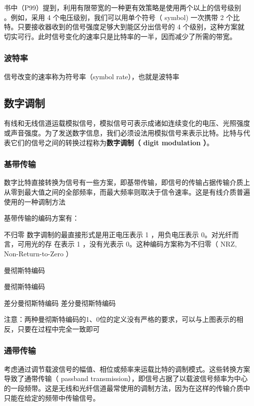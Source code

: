 书中（P99）提到，利用有限带宽的一种更有效策略是使用两个以上的信号级别 。例如，采用 4 个电压级别，我们可以用单个符号（ symbol) 一次携带 2 个比特。只要接收器收到的信号强度足够大到能区分出信号的 4 个级别，这种方案就切实可行。此时信号变化的速率只是比特率的一半，因而减少了所需的带宽。 

\subsubsection{波特率}
信号改变的速率称为符号率（symbol rate），也就是波特率

\subsection{数字调制}
有线和无线信道运载模拟信号，模拟信号可表示成诸如连续变化的电压、光照强度或声音强度。为了发送数字信息，我们必须设法用模拟信号来表示比特。比特与代表它们的信号之间的转换过程称为\textbf{数字调制（ digit modulation ）}。 
\subsubsection{基带传输}
数字比特直接转换为信号有一些方案，即基带传输，即信号的传输占据传输介质上从零到最大值之间的全部频率，而最大频率则取决于信令速率。这是有线介质普遍使用的一种调制方法 

基带传输的编码方案有：
\begin{parabox}{不归零}
    数字调制的最直接形式是用正电压表示 1 ，用负电压表示 0。对光纤而言，可用光的存
在表示 1 ，没有光表示 0。这种编码方案称为不归零（ NRZ, Non-Return-to-Zero ）     
\end{parabox}

\begin{parabox}{曼彻斯特编码}

    曼彻斯特编码
\end{parabox}

\begin{parabox}{差分曼彻斯特编码}
    差分曼彻斯特编码
\end{parabox}

注意：两种曼彻斯特编码的1、0位的定义没有严格的要求，可以与上图表示的相反，只要在过程中完全一致即可


\subsubsection{通带传输}
考虑通过调节载波信号的幅值、相位或频率来运载比特的调制模式。这些转换方案导致了通带传输（ passband transmission），即信号占据了以载波信号频率为中心的一段频带。这是无线和光纤信道最常使用的调制方法，因为在这样的传输介质中只能在给定的频带中传输信号。 
